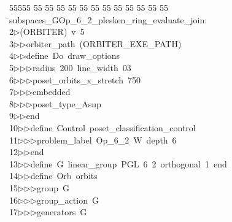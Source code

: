 %
%
\begin{tabbing}
55555 \= 55 \= 55 \= 55 \= 55 \= 55 \= 55 \= 55 \= 55 \= 55 \= 55 \= 55 \= 55 \= \>subspaces\_GOp\_6\_2\_plesken\_ring\_evaluate\_join:\\[0pt]
2\>$\triangleright$\>(ORBITER)\ v\ 5\ \\[0pt]
3\>$\triangleright$\>$\triangleright$\>orbiter\_path\ (ORBITER\_EXE\_PATH)\ \\[0pt]
4\>$\triangleright$\>$\triangleright$\>define\ Do\ draw\_options\ \\[0pt]
5\>$\triangleright$\>$\triangleright$\>$\triangleright$\>radius\ 200\ line\_width\ 03\ \\[0pt]
6\>$\triangleright$\>$\triangleright$\>$\triangleright$\>poset\_orbits\_x\_stretch\ 750\ \\[0pt]
7\>$\triangleright$\>$\triangleright$\>$\triangleright$\>embedded\ \\[0pt]
8\>$\triangleright$\>$\triangleright$\>$\triangleright$\>poset\_type\_Asup\ \\[0pt]
9\>$\triangleright$\>$\triangleright$\>end\ \\[0pt]
10\>$\triangleright$\>$\triangleright$\>define\ Control\ poset\_classification\_control\ \\[0pt]
11\>$\triangleright$\>$\triangleright$\>$\triangleright$\>problem\_label\ Op\_6\_2\ W\ depth\ 6\ \\[0pt]
12\>$\triangleright$\>$\triangleright$\>end\ \\[0pt]
13\>$\triangleright$\>$\triangleright$\>define\ G\ linear\_group\ PGL\ 6\ 2\ orthogonal\ 1\ end\ \\[0pt]
14\>$\triangleright$\>$\triangleright$\>define\ Orb\ orbits\ \\[0pt]
15\>$\triangleright$\>$\triangleright$\>$\triangleright$\>group\ G\ \\[0pt]
16\>$\triangleright$\>$\triangleright$\>$\triangleright$\>group\_action\ G\ \\[0pt]
17\>$\triangleright$\>$\triangleright$\>$\triangleright$\>generators\ G\ \\[0pt]

\end{tabbing}
